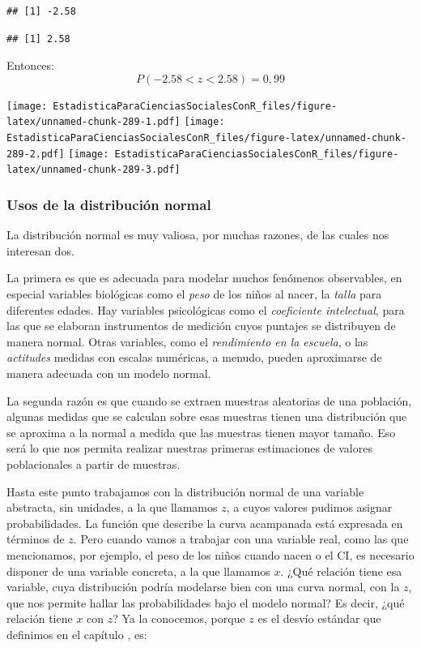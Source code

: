 \documentclass[]{book}
\begin{document}
\begin{verbatim}
## [1] -2.58
\end{verbatim}

\begin{verbatim}
## [1] 2.58
\end{verbatim}

Entonces:
\[P(- 2.58 < z < 2.58) = 0,99\]

\texttt{[image: EstadisticaParaCienciasSocialesConR\_files/figure-latex/unnamed-chunk-289-1.pdf]} \texttt{[image: EstadisticaParaCienciasSocialesConR\_files/figure-latex/unnamed-chunk-289-2.pdf]} \texttt{[image: EstadisticaParaCienciasSocialesConR\_files/figure-latex/unnamed-chunk-289-3.pdf]}

\hypertarget{usos-de-la-distribuciuxf3n-normal}{%
\subsubsection{Usos de la distribución normal}\label{usos-de-la-distribuciuxf3n-normal}}

La distribución normal es muy valiosa, por muchas razones, de las cuales nos interesan dos.

La primera es que es adecuada para modelar muchos fenómenos observables,
en especial variables biológicas como el \emph{peso} de los niños al nacer,
la \emph{talla} para diferentes edades. Hay variables psicológicas como el
\emph{coeficiente intelectual}, para las que se elaboran instrumentos de
medición cuyos puntajes se distribuyen de manera normal. Otras
variables, como el \emph{rendimiento en la escuela}, o las \emph{actitudes} medidas con escalas numéricas, a menudo, pueden aproximarse de manera adecuada con un modelo normal.

La segunda razón es que cuando se extraen muestras aleatorias de una
población, algunas medidas que se calculan sobre esas muestras tienen
una distribución que se aproxima a la normal a medida que las muestras
tienen mayor tamaño. Eso será lo que nos permita realizar nuestras
primeras estimaciones de valores poblacionales a partir de muestras.

Hasta este punto trabajamos con la distribución normal de una variable
abstracta, sin unidades, a la que llamamos \(z\), a cuyos valores pudimos
asignar probabilidades. La función que describe la curva acampanada está expresada en términos de \(z\). Pero cuando vamos a trabajar
con una variable real, como las que mencionamos, por ejemplo, el peso de los niños cuando nacen o el CI, es necesario disponer de una variable concreta, a la que llamamos \(x\). ¿Qué relación tiene esa variable, cuya distribución podría modelarse bien con una curva normal, con la \(z\), que nos permite hallar las probabilidades bajo el modelo normal? Es decir, ¿qué relación tiene \(x\) con \(z\)? Ya la conocemos, porque \(z\) es el desvío estándar que definimos en el capítulo , es:
\end{document}
